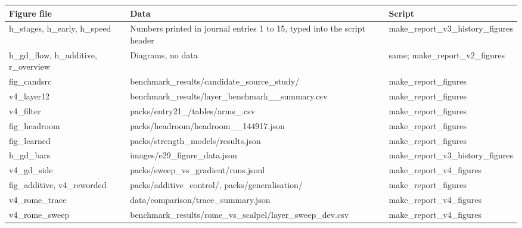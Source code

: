 \documentclass[11pt,twocolumn]{article}
\begin{document}
\begin{center}
\footnotesize
\begin{tabular}{@{}p{}p{}p{}@{}}
\toprule
\textbf{Figure file} & \textbf{Data} & \textbf{Script}\\
\midrule
h\_\allowbreak stages, h\_\allowbreak early, h\_\allowbreak speed & Numbers printed in journal entries 1 to 15, typed into the script header & make\_\allowbreak report\_\allowbreak v3\_\allowbreak history\_\allowbreak figures\\
h\_\allowbreak gd\_\allowbreak flow, h\_\allowbreak additive, r\_\allowbreak overview & Diagrams, no data & same; make\_\allowbreak report\_\allowbreak v2\_\allowbreak figures\\
fig\_\allowbreak candsrc & benchmark\_\allowbreak results/candidate\_\allowbreak source\_\allowbreak study/ & make\_\allowbreak report\_\allowbreak figures\\
v4\_\allowbreak layer12 & benchmark\_\allowbreak results/layer\_\allowbreak benchmark\_\allowbreak 20260909\_\allowbreak summary.csv & make\_\allowbreak report\_\allowbreak figures\\
v4\_\allowbreak filter & packs/entry21\_\allowbreak */tables/arms\_\allowbreak *.csv & make\_\allowbreak report\_\allowbreak figures\\
fig\_\allowbreak headroom & packs/headroom/headroom\_\allowbreak 20261002\_\allowbreak 144917.json & make\_\allowbreak report\_\allowbreak figures\\
fig\_\allowbreak learned & packs/strength\_\allowbreak models/results.json & make\_\allowbreak report\_\allowbreak figures\\
h\_\allowbreak gd\_\allowbreak bars & images/e29\_\allowbreak figure\_\allowbreak data.json & make\_\allowbreak report\_\allowbreak v3\_\allowbreak history\_\allowbreak figures\\
v4\_\allowbreak gd\_\allowbreak side & packs/sweep\_\allowbreak vs\_\allowbreak gradient/runs.jsonl & make\_\allowbreak report\_\allowbreak v4\_\allowbreak figures\\
fig\_\allowbreak additive, v4\_\allowbreak reworded & packs/additive\_\allowbreak control/, packs/generalisation/ & make\_\allowbreak report\_\allowbreak figures\\
v4\_\allowbreak rome\_\allowbreak trace & data/comparison/trace\_\allowbreak summary.json & make\_\allowbreak report\_\allowbreak v4\_\allowbreak figures\\
v4\_\allowbreak rome\_\allowbreak sweep & benchmark\_\allowbreak results/rome\_\allowbreak vs\_\allowbreak scalpel/layer\_\allowbreak sweep\_\allowbreak dev.csv & make\_\allowbreak report\_\allowbreak v4\_\allowbreak figures\\

\end{tabular}
\end{center}
\end{document}
